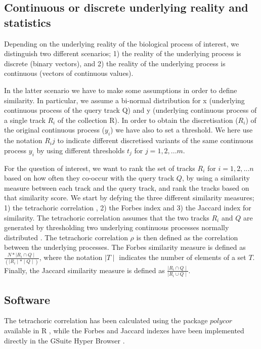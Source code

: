 \documentclass{bioinfo}
\begin{document}
\begin{methods}
\subsection{Continuous or discrete underlying reality and statistics}
Depending on the underlying reality of the biological process of interest, we distinguish two different scenarios; 1) the reality of the underlying process is discrete (binary vectors), and 2) the reality of the underlying process is continuous (vectors of continuous values). 
\par In the latter scenario we have to make some assumptions in order to define similarity. In particular, we assume a bi-normal distribution for x (underlying continuous process of the query track Q) and y (underlying continuous process of a single track $R_i$ of the collection R). In order to obtain the discretisation ($R_i$) of the original continuous process ($y_i$) we have also to set a threshold. We here use the notation $R_ij$ to indicate different discretised variants of the same continuous process $y_i$  by using different thresholds $t_j$ for $j=1,2, ...m$.  
\par For the question of interest, we want to rank the set of tracks $R_i$ for $i=1,2, ...n$ based on how often they co-occur with the query track $Q$, by using a similarity measure between each track and the query track, and rank the tracks based on that similarity score.
We start by defying the three different similarity measures; 1) the tetrachoric correlation \cite{drasgow1988polychoric,olsson1979maximum,pearson1896mathematical}, 2) the Forbes index \cite{forbes1907local} and 3) the Jaccard index \cite{jaccard1901etude} for similarity. 
The tetrachoric correlation assumes that the two tracks $R_i$ and $Q$ are generated by thresholding two underlying continuous processes normally distributed \cite{hamedani1975determination}. The tetrachoric correlation $\rho$ is then defined as the correlation between the underlying processes. The Forbes similarity measure is defined as $\frac{N *\mid R_i  \cap Q\mid}{ (\mid R_i\mid * \mid Q \mid)}$, where the notation $\mid T\mid $ indicates the number of elements of a set $T$. Finally, the Jaccard similarity measure is defined as $\frac{\mid R_i  \cap Q\mid}{ \mid R_i  \cup Q\mid}$.
\subsection{Software}
The tetrachoric correlation has been calculated using the package $polycor$ \cite{fox2010polycor} available in R \cite{team2000r}, while the Forbes and Jaccard indexes have been implemented directly in the GSuite Hyper Browser \cite{sandve2010genomic}.


\end{methods}
\end{document}
